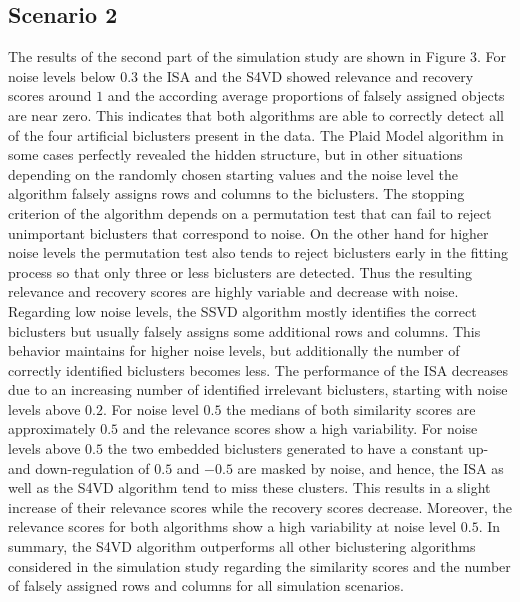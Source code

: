 \subsection{Scenario 2}
The results of the second part of the simulation study are shown in Figure 3. For noise levels below $0.3$ the ISA and the S4VD showed relevance and recovery scores around $1$ and the according average proportions of falsely assigned objects are near zero. This indicates that both algorithms are able to correctly detect all of the four artificial biclusters present in the data. 
The Plaid Model algorithm in some cases perfectly revealed the hidden structure, but in other situations depending on the randomly chosen starting values and the noise level the algorithm falsely assigns rows and columns to the biclusters. The stopping criterion of the algorithm depends on a permutation test that can fail to reject unimportant biclusters that correspond to noise. On the other hand for higher noise levels the permutation test also tends to reject biclusters early in the fitting process so that only three or less biclusters are detected. Thus the resulting relevance and recovery scores are highly variable and decrease with noise.
Regarding low noise levels, the SSVD algorithm mostly identifies the correct biclusters but usually falsely assigns some additional rows and columns. This behavior maintains for higher noise levels, but additionally the number of correctly identified biclusters becomes less. 
The performance of the ISA decreases due to an increasing number of identified irrelevant biclusters, starting with noise levels above $0.2$. For noise level $0.5$ the medians of both similarity scores are approximately $0.5$ and the relevance scores show a high variability. For noise levels above $0.5$ the two embedded biclusters generated to have a constant up- and down-regulation of $0.5$ and $-0.5$ are masked by noise, and hence, the ISA as well as the S4VD algorithm tend to miss these clusters. This results in a slight increase of their relevance scores while the recovery scores decrease. Moreover, the relevance scores for both algorithms show a high variability at noise level $0.5$. In summary, the S4VD algorithm outperforms all other biclustering algorithms considered in the simulation study regarding the  similarity scores and the number of falsely assigned rows and columns for all simulation scenarios.

